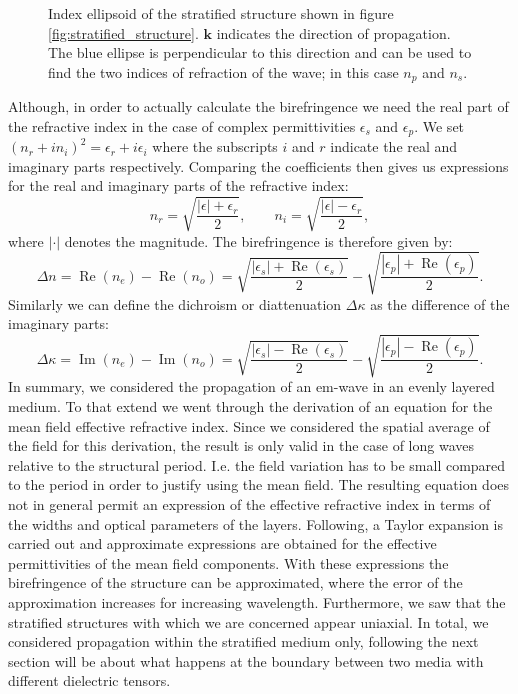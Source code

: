 \begin{figure}[h]
    \centering
    
    \caption{Index ellipsoid of the stratified structure shown in figure \ref{fig:stratified_structure}. $\bm{k}$ indicates the direction of propagation. The blue ellipse is perpendicular to this direction and can be used to find the two indices of refraction of the wave; in this case $n_{p}$ and $n_{s}$.}
    \label{fig:index_ellipse}
\end{figure}
Although, in order to actually calculate the birefringence we need the real part of the refractive index in the case of complex permittivities $\epsilon_{s}$ and $\epsilon_{p}$. We set $(n_r+in_i)^2 = \epsilon_r + i\epsilon_i$ where the subscripts $i$ and $r$ indicate the real and imaginary parts respectively. Comparing the coefficients then gives us expressions for the real and imaginary parts of the refractive index:
\begin{equation}
    n_r = \sqrt{\frac{|\epsilon|+\epsilon_r}{2}}, 
    \qquad 
    n_i = \sqrt{\frac{|\epsilon|-\epsilon_r}{2}},
\end{equation}
where $|\cdot|$ denotes the magnitude. The birefringence is therefore given by:
\begin{equation}
    \Delta n = \operatorname{Re}(n_e) - \operatorname{Re}(n_o) = \sqrt{\frac{|\epsilon_s|+\operatorname{Re}(\epsilon_s)}{2}} - \sqrt{\frac{|\epsilon_p|+\operatorname{Re}(\epsilon_p)}{2}}.
\end{equation}
Similarly we can define the dichroism or diattenuation $\Delta \kappa$ as the difference of the imaginary parts:
\begin{equation}
    \Delta \kappa = \operatorname{Im}(n_e) - \operatorname{Im}(n_o) = \sqrt{\frac{|\epsilon_s|-\operatorname{Re}(\epsilon_s)}{2}} - \sqrt{\frac{|\epsilon_p|-\operatorname{Re}(\epsilon_p)}{2}}.
\end{equation}
In summary, we considered the propagation of an em-wave in an evenly layered medium. To that extend we went through the derivation of an equation for the mean field effective refractive index. Since we considered the spatial average of the field for this derivation, the result is only valid in the case of long waves relative to the structural period. I.e. the field variation has to be small compared to the period in order to justify using the mean field. The resulting equation does not in general permit an expression of the effective refractive index in terms of the widths and optical parameters of the layers. Following, a Taylor expansion is carried out and approximate expressions are obtained for the effective permittivities of the mean field components. With these expressions the birefringence of the structure can be approximated, where the error of the approximation increases for increasing wavelength. Furthermore, we saw that the stratified structures with which we are concerned appear uniaxial. In total, we considered propagation within the stratified medium only, following the next section will be about what happens at the boundary between two media with different dielectric tensors.

